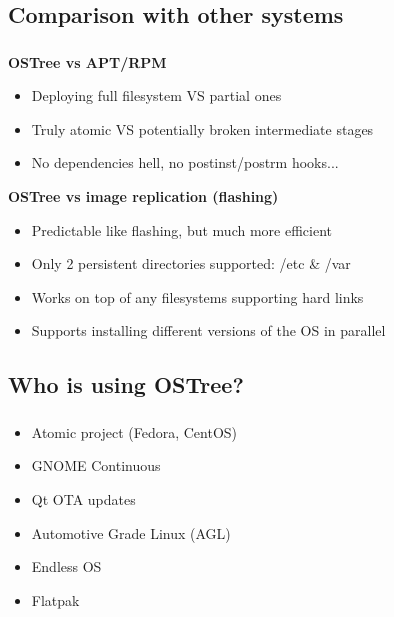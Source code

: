 \subsection{Comparison with other systems}
\begin{frame}
  \frametitle{\insertsubsection}

  \textbf{OSTree vs APT/RPM}
  \begin{itemize}
  \item Deploying full filesystem VS partial ones\vspacing
  \item Truly atomic VS potentially broken intermediate stages\vspacing
  \item No dependencies hell, no postinst/postrm hooks...\vspacing
  \end{itemize}

  \textbf{OSTree vs image replication (flashing)}
  \begin{itemize}
  \item Predictable like flashing, but much more efficient\vspacing
  \item Only 2 persistent directories supported: /etc \& /var\vspacing
  \item Works on top of any filesystems supporting hard links\vspacing
  \item Supports installing different versions of the OS in parallel
  \end{itemize}
\end{frame}

\subsection{Who is using OSTree?}
\begin{frame}
  \frametitle{\insertsubsection}

    \begin{itemize}
      \item Atomic project (Fedora, CentOS)\vspacing
      \item GNOME Continuous\vspacing
      \item Qt OTA updates\vspacing
      \item Automotive Grade Linux (AGL)\vspacing
      \item Endless OS\vspacing
      \item Flatpak
    \end{itemize}
\end{frame}
